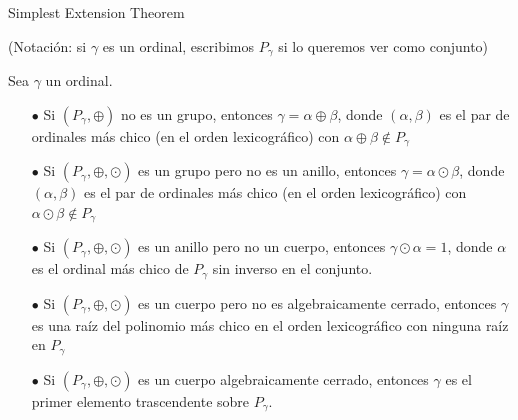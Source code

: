 \documentclass[10pt,spanish]{beamer}
\begin{document}
\begin{frame}{Simplest Extension Theorem}

(Notación: si $\gamma$ es un ordinal, escribimos $P_\gamma$ si lo queremos ver como conjunto)

Sea $\gamma$ un ordinal.

\begin{itemize}
	\item[$\bullet$]  Si $(P_\gamma, \oplus)$ no es un grupo, entonces $\gamma = \alpha \oplus \beta$, donde $(\alpha,\beta)$ es el par de ordinales más chico (en el orden lexicográfico) con $\alpha \oplus \beta \not\in P_\gamma$
	\item[$\bullet$]  Si $(P_\gamma, \oplus, \odot)$ es un grupo pero no es un anillo, entonces $\gamma = \alpha \odot \beta$, donde $(\alpha,\beta)$ es el par de ordinales más chico (en el orden lexicográfico) con $\alpha \odot \beta \not\in P_\gamma$
	\item[$\bullet$]  Si $(P_\gamma, \oplus, \odot)$ es un anillo pero no un cuerpo, entonces $\gamma \odot \alpha =1$, donde $\alpha$ es el ordinal más chico de $P_\gamma$ sin inverso en el conjunto.
	\item[$\bullet$]  Si $(P_\gamma, \oplus, \odot)$ es un cuerpo pero no es algebraicamente cerrado, entonces $\gamma$ es una raíz del polinomio más chico en el orden lexicográfico con ninguna raíz en $P_\gamma$
	\item[$\bullet$]  Si $(P_\gamma, \oplus, \odot)$ es un cuerpo algebraicamente cerrado, entonces $\gamma$ es el primer elemento trascendente sobre $P_\gamma$.
\end{itemize}






\end{frame}
\end{document}

